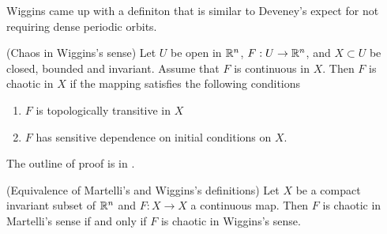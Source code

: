 \documentclass[11pt]{book}
\begin{document}
Wiggins came up with a definiton that is similar to Deveney's expect for not requiring dense periodic orbits.

\begin{definition}
  (Chaos in Wiggins's sense)
   Let $U$ be open in $\mathbb{R}^n$, $F: U \to \mathbb{R}^n$, and $X\subset U$ be closed, bounded and invariant.
  Assume that $F$ is continuous in $X$.
  Then $F$ is chaotic in $X$ if the mapping satisfies the following conditions
  \begin{enumerate}
    \item $F$ is topologically transitive in $X$
    \item $F$ has sensitive dependence on initial conditions on $X$.
  \end{enumerate}
  \label{defn:chaoswiggins}
\end{definition}

The outline of proof is in \cite{martelli98}.
\begin{theorem}
  (Equivalence of Martelli's and Wiggins's definitions)
  Let $X$ be a compact invariant subset of $\mathbb{R}^n$ and $F: X\to X$ a continuous map.
  Then $F$ is chaotic in Martelli's sense if and only if $F$ is chaotic in Wiggins's sense.
  \label{thm:martelliwigginsequiv}
\end{theorem}
\end{document}
